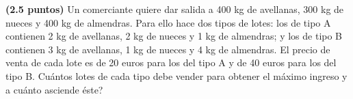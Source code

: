 
\textbf{(2.5 puntos)} Un comerciante quiere dar salida a 400 kg de avellanas, 300 kg de nueces y 400 kg de almendras. Para ello hace dos tipos de lotes: los de tipo A contienen 2 kg de avellanas, 2 kg de nueces y 1 kg de almendras; y los de tipo B contienen 3 kg de avellanas, 1 kg de nueces y 4 kg de almendras. El precio de venta de cada lote es de 20 euros para los del tipo A y de 40 euros para los del tipo B. \textquestiondown{}Cuántos lotes de cada tipo debe vender para obtener el máximo ingreso y a cuánto asciende éste?
